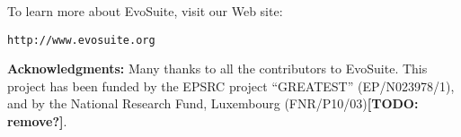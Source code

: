 \documentclass[sigconf,table]{acmart}
\newcommand{\TODO}[1]{\textbf{\textcolor{ScarletRed}{[TODO: #1]}}\xspace}
\newcommand{\TODO}[1]{}
\newcommand{\EVOSUITE}{{\sc EvoSuite}\xspace}
\begin{document}
To learn more about \EVOSUITE, visit our Web site:
\begin{center}
\texttt{http://www.evosuite.org}
\end{center}



\textbf{Acknowledgments:} Many thanks to all the contributors to \EVOSUITE.
This project has been funded by the EPSRC
project ``GREATEST'' (EP/N023978/1), and by the National Research
Fund, Luxembourg (FNR/P10/03)\TODO{remove?}.




\balance
\end{document}
